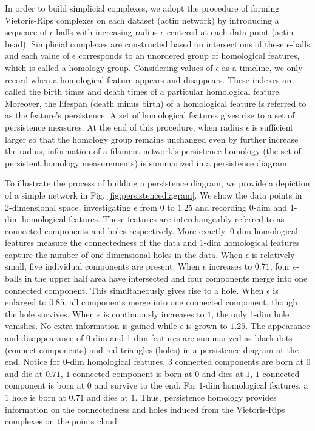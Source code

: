 \documentclass[10pt]{article}
\begin{document}
In order to build simplicial complexes, we adopt the procedure of forming Vietoris-Rips complexes on each dataset (actin network) by introducing a sequence of $\epsilon$-balls with increasing radius $\epsilon$ centered at each data point (actin bead). Simplicial complexes are constructed based on intersections of these $\epsilon$-balls and each value of $\epsilon$ corresponds to an unordered group of homological features, which is called a homology group. Considering values of $\epsilon$ as a timeline, we only record when a homological feature appears and disappears. These indexes are called the birth times and death times of a particular homological feature. Moreover, the lifespan (death minus birth) of a homological feature is referred to as the feature's persistence. A set of homological features gives rise to a set of persistence measures. At the end of this procedure, when radius $\epsilon$ is sufficient larger so that the homology group remains unchanged even by further increase the radius, information of a filament network's persistence homology (the set of persistent homology measurements) is summarized in a persistence diagram.

To illustrate the process of building a persistence diagram, we provide a depiction of a simple network in Fig. \ref{fig:persistencediagram}. We show the data points in 2-dimensional space, investigating $\epsilon$ from $0$ to $1.25$ and recording 0-dim and 1-dim homological features. These features are interchangeably referred to as connected components and holes respectively. More exactly, 0-dim homological features measure the connectedness of the data and 1-dim homological features capture the number of one dimensional holes in the data. When $\epsilon$ is relatively small, five individual components are present. When $\epsilon$ increases to $0.71$, four $\epsilon$-balls in the upper half area have intersected and four components merge into one connected component. This simultaneously gives rise to a hole. When $\epsilon$ is enlarged to $0.85$, all components merge into one connected component, though the hole survives. When $\epsilon$ is continuously increases to $1$, the only 1-dim hole vanishes. No extra information is gained while $\epsilon$ is grown to $1.25$. The appearance and disappearance of 0-dim and 1-dim features are summarized as black dots (connect components) and red triangles (holes) in a persistence diagram at the end. Notice for $0$-dim homological features, $3$ connected components are born at $0$ and die at $0.71$, $1$ connected component is born at $0$ and dies at $1$, $1$ connected component is born at $0$ and survive to the end. For $1$-dim homological features, a $1$ hole is born at $0.71$ and dies at $1$. Thus, persistence homology provides information on the connectedness and holes induced from the Vietoris-Rips complexes on the points cloud. 
\end{document}
